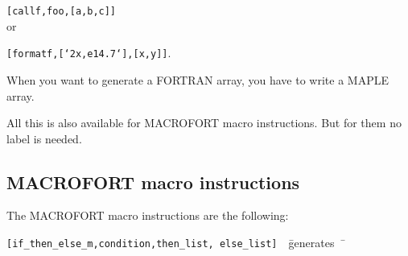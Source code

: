 {\tt [callf,foo,[a,b,c]]}\\or

{\tt [formatf,[`2x,e14.7`],[x,y]]}.

When you want to generate a FORTRAN array, you have to write a MAPLE array.

All this is also available for MACROFORT macro instructions. But for them
no label is needed.
 
\subsection{MACROFORT macro instructions}
\label{macro}

The MACROFORT macro instructions are the following:

\begin{tabbing}
  {\tt [if\_then\_else\_m,{\rm condition},{\rm then\_list},
       {\rm else\_list}]}\ \ \=generates\ \ \= \kill 


\end{tabbing}
